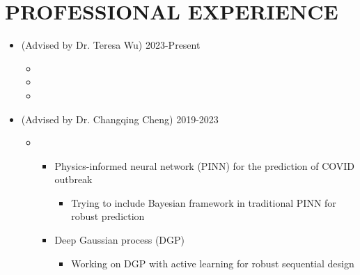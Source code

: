 \documentclass[10pt]{article}
\begin{document}
\section*{PROFESSIONAL EXPERIENCE}
\begin{itemize}
	\item {} (Advised by Dr. Teresa Wu)
        \hfill{2023-Present}
        \begin{itemize}[label=$\bullet$]
            \item {}
            \item {}
            \item {}
        \end{itemize}
        
        
	\item {} (Advised by Dr. Changqing Cheng)
	\hfill{2019-2023}
	\begin{itemize}[label=$\bullet$]
	
	    \item {}
		\begin{itemize}[label=$\bullet$]
		    \item Physics-informed neural network (PINN) for the prediction of COVID outbreak 
		    \begin{itemize}[label=$-$]
	            \item Trying to include Bayesian framework in traditional PINN for robust prediction
	        \end{itemize}
	        
		    \item Deep Gaussian process (DGP)
		    \begin{itemize}[label=$-$]
	            \item Working on DGP with active learning for robust sequential design 
	        \end{itemize}
		\end{itemize}
		

\end{itemize}
\end{itemize}
\end{document}
